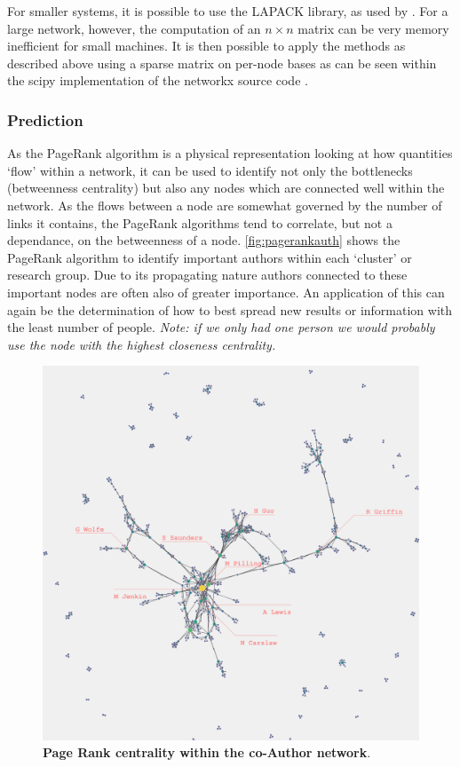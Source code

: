 For smaller systems, it is possible to use the LAPACK \citep{lapack} library, as used by \citep{numpy}. For a large network, however, the computation of an $n \times n $ matrix can be very memory inefficient for small machines. It is then possible to apply the methods as described above using a sparse matrix on per-node bases as can be seen within the scipy implementation of the networkx source code \citep{scipy,networkx}.

\subsubsection{Prediction}\label{sec:applypr}
As the PageRank algorithm is a physical representation looking at how quantities `flow' within a network, it can be used to identify not only the bottlenecks (betweenness centrality) but also any nodes which are connected well within the network. As the flows between a node are somewhat governed by the number of links it contains, the PageRank algorithms tend to correlate, but not a dependance, on the betweenness of a node. \autoref{fig:pagerankauth} shows the PageRank algorithm to identify important authors within each `cluster' or research group. Due to its propagating nature authors connected to these important nodes are often also of greater importance. An application of this can again be the determination of how to best spread new results or information with the least number of people. \textit{Note: if we only had one person we would probably use the node with the highest closeness centrality.}

\begin{figure}[H]
     \centering
         \includegraphics[width=.8\textwidth]{figures_c3/pagerankauthor.png}

        
                \caption{ \textbf{Page Rank centrality within the co-Author network}.}
        \label{fig:pagerankauth}
\end{figure}


